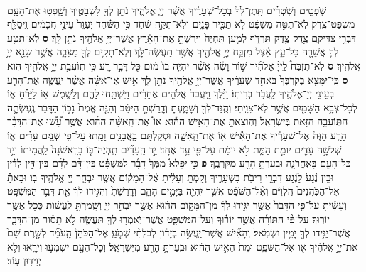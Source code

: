 \documentclass[twoside, openany, parskip=half, 11pt]{book}
\begin{document}
\begin{footnotesize}
\begin{multicols}{2}
\\
 שֹֽׁפְטִ֣ים וְשֹֽׁטְרִ֗ים תִּֽתֶּן־לְךָ֙ בְּכָל־שְׁעָרֶ֔יךָ אֲשֶׁ֨ר יְיָ֧ אֱלֹהֶ֛יךָ נֹתֵ֥ן לְךָ֖ לִשְׁבָטֶ֑יךָ וְשָֽׁפְט֥וּ אֶת־הָעָ֖ם מִשְׁפַּט־צֶֽדֶק׃ לֹֽא־תַטֶּ֣ה מִשְׁפָּ֔ט לֹ֥א תַכִּ֖יר פָּנִ֑ים וְלֹֽא־תִקַּ֣ח שֹׁ֔חַד כִּ֣י הַשֹּׁ֗חַד יְעַוֵּר֙ עֵינֵ֣י חֲכָמִ֔ים וִֽיסַלֵּ֖ף דִּבְרֵ֥י צַדִּיקִֽם׃ צֶ֥דֶק צֶ֖דֶק תִּרְדֹּ֑ף לְמַ֤עַן תִּֽחְיֶה֙ וְיָֽרַשְׁתָּ֣ אֶת־הָאָ֔רֶץ אֲשֶׁר־יְיָ֥ אֱלֹהֶ֖יךָ נֹתֵ֥ן לָֽךְ׃ \textbf{ס} 
 לֹֽא־תִטַּ֥ע לְךָ֛ אֲשֵׁרָ֖ה כָּל־עֵ֑ץ אֵ֗צֶל מִזְבַּ֛ח יְיָ֥ אֱלֹהֶ֖יךָ אֲשֶׁ֥ר תַּֽעֲשֶׂה־לָּֽךְ׃ וְלֹֽא־תָקִ֥ים לְךָ֖ מַצֵּבָ֑ה אֲשֶׁ֥ר שָׂנֵ֖א יְיָ֥ אֱלֹהֶֽיךָ׃ \textbf{ס} לֹֽא־תִזְבַּח֩ לַֽיְיָ֨ אֱלֹהֶ֜יךָ שׁ֣וֹר וָשֶׂ֗ה אֲשֶׁ֨ר יִהְיֶ֥ה בוֹ֙ מ֔וּם כֹּ֖ל דָּבָ֣ר רָ֑ע כִּ֧י תֽוֹעֲבַ֛ת יְיָ֥ אֱלֹהֶ֖יךָ הֽוּא׃ \textbf{ס} כִּֽי־יִמָּצֵ֤א בְקִרְבְּךָ֙ בְּאַחַ֣ד שְׁעָרֶ֔יךָ אֲשֶׁר־יְיָ֥ אֱלֹהֶ֖יךָ נֹתֵ֣ן לָ֑ךְ אִ֣ישׁ אֽוֹ־אִשָּׁ֗ה אֲשֶׁ֨ר יַֽעֲשֶׂ֧ה אֶת־הָרַ֛ע בְּעֵינֵי יְיָ־אֱלֹהֶ֖יךָ לַֽעֲבֹ֥ר בְּרִיתֽוֹ׃ וַיֵּ֗לֶךְ וַֽיַּֽעֲבֹד֙ אֱלֹהִ֣ים אֲחֵרִ֔ים וַיִּשְׁתַּ֖חוּ לָהֶ֑ם וְלַשֶּׁ֣מֶשׁ א֣וֹ לַיָּרֵ֗חַ א֛וֹ לְכָל־צְבָ֥א הַשָּׁמַ֖יִם אֲשֶׁ֥ר לֹֽא־צִוִּֽיתִי׃ וְהֻֽגַּד־לְךָ֖ וְשָׁמָ֑עְתָּ וְדָֽרַשְׁתָּ֣ הֵיטֵ֔ב וְהִנֵּ֤ה אֱמֶת֙ נָכ֣וֹן הַדָּבָ֔ר נֶֽעֶשְׂתָ֛ה הַתּֽוֹעֵבָ֥ה הַזֹּ֖את בְּיִשְׂרָאֵֽל׃ וְהֽוֹצֵאתָ֣ אֶת־הָאִ֣ישׁ הַה֡וּא אוֹ֩ אֶת־הָֽאִשָּׁ֨ה הַהִ֜וא אֲשֶׁ֣ר עָ֠שׂ֠וּ אֶת־הַדָּבָ֨ר הָרָ֤ע הַזֶּה֙ אֶל־שְׁעָרֶ֔יךָ אֶת־הָאִ֕ישׁ א֖וֹ אֶת־הָֽאִשָּׁ֑ה וּסְקַלְתָּ֥ם בָּֽאֲבָנִ֖ים וָמֵֽתוּ׃ עַל־פִּ֣י שְׁנַ֣יִם עֵדִ֗ים א֛וֹ שְׁלשָׁ֥ה עֵדִ֖ים יוּמַ֣ת הַמֵּ֑ת לֹ֣א יוּמַ֔ת עַל־פִּ֖י עֵ֥ד אֶחָֽד׃ יַ֣ד הָֽעֵדִ֞ים תִּֽהְיֶה־בּ֤וֹ בָרִֽאשֹׁנָה֙ לַֽהֲמִית֔וֹ וְיַ֥ד כָּל־הָעָ֖ם בָּאַֽחֲרֹנָ֑ה וּבִֽעַרְתָּ֥ הָרָ֖ע מִקִּרְבֶּֽךָ׃ \textbf{פ} 
כִּ֣י יִפָּלֵא֩ מִמְּךָ֙ דָבָ֜ר לַמִּשְׁפָּ֗ט בֵּין־דָּ֨ם לְדָ֜ם בֵּין־דִּ֣ין לְדִ֗ין וּבֵ֥ין נֶ֨גַע֙ לָנֶ֔גַע דִּבְרֵ֥י רִיבֹ֖ת בִּשְׁעָרֶ֑יךָ וְקַמְתָּ֣ וְעָלִ֔יתָ אֶ֨ל־הַמָּק֔וֹם אֲשֶׁ֥ר יִבְחַ֛ר יְיָ֥ אֱלֹהֶ֖יךָ בּֽוֹ׃ וּבָאתָ֗ אֶל־הַכֹּֽהֲנִים֙ הַֽלְוִיִּ֔ם וְאֶ֨ל־הַשֹּׁפֵ֔ט אֲשֶׁ֥ר יִֽהְיֶ֖ה בַּיָּמִ֣ים הָהֵ֑ם וְדָֽרַשְׁתָּ֙ וְהִגִּ֣ידוּ לְךָ֔ אֵ֖ת דְּבַ֥ר הַמִּשְׁפָּֽט׃ וְעָשִׂ֗יתָ עַל־פִּ֤י הַדָּבָר֙ אֲשֶׁ֣ר יַגִּ֣ידוּ לְךָ֔ מִן־הַמָּק֣וֹם הַה֔וּא אֲשֶׁ֖ר יִבְחַ֣ר יְיָ֑ וְשָֽׁמַרְתָּ֣ לַֽעֲשׂ֔וֹת כְּכֹ֖ל אֲשֶׁ֥ר יוֹרֽוּךָ׃ 
עַל־פִּ֨י הַתּוֹרָ֜ה אֲשֶׁ֣ר יוֹר֗וּךָ וְעַל־הַמִּשְׁפָּ֛ט אֲשֶׁר־יֹֽאמְר֥וּ לְךָ֖ תַּֽעֲשֶׂ֑ה לֹ֣א תָס֗וּר מִן־הַדָּבָ֛ר אֲשֶׁר־יַגִּ֥ידוּ לְךָ֖ יָמִ֥ין וּשְׂמֹֽאל׃ וְהָאִ֞ישׁ אֲשֶׁר־יַֽעֲשֶׂ֣ה בְזָד֗וֹן לְבִלְתִּ֨י שְׁמֹ֤עַֽ אֶל־הַכֹּהֵן֙ הָֽעֹמֵ֞ד לְשָׁ֤רֶת שָׁם֙ אֶת־יְיָ֣ אֱלֹהֶ֔יךָ א֖וֹ אֶל־הַשֹּׁפֵ֑ט וּמֵת֙ הָאִ֣ישׁ הַה֔וּא וּבִֽעַרְתָּ֥ הָרָ֖ע מִיִּשְׂרָאֵֽל׃ וְכָל־הָעָ֖ם יִשְׁמְע֣וּ וְיִרָ֑אוּ וְלֹ֥א יְזִיד֖וּן עֽוֹד׃


\end{multicols}
\end{footnotesize}
\end{document}
